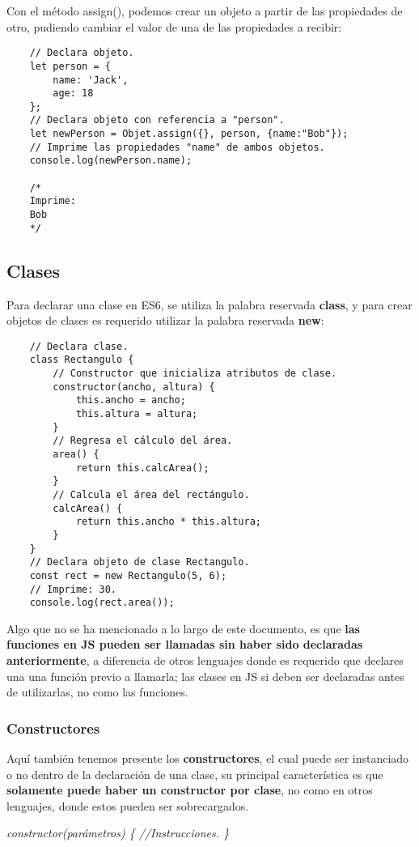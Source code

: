 Con el método assign(), podemos crear un objeto a partir de las propiedades de otro, pudiendo cambiar el valor de una de las propiedades a recibir:
\begin{lstlisting}
    // Declara objeto.
    let person = {
        name: 'Jack',
        age: 18
    };
    // Declara objeto con referencia a "person".
    let newPerson = Objet.assign({}, person, {name:"Bob"});
    // Imprime las propiedades "name" de ambos objetos.
    console.log(newPerson.name);

    /*
    Imprime:
    Bob
    */
\end{lstlisting}


\subsection{Clases}
\hspace{0.55cm}Para declarar una clase en ES6, se utiliza la palabra reservada \textbf{class}, y para crear objetos de clases es requerido utilizar la palabra reservada \textbf{new}:
\begin{lstlisting}
    // Declara clase.
    class Rectangulo {
        // Constructor que inicializa atributos de clase.
        constructor(ancho, altura) {
            this.ancho = ancho;
            this.altura = altura;
        }
        // Regresa el cálculo del área.
        area() {
            return this.calcArea();
        }
        // Calcula el área del rectángulo.
        calcArea() {
            return this.ancho * this.altura;
        }
    }
    // Declara objeto de clase Rectangulo.
    const rect = new Rectangulo(5, 6);
    // Imprime: 30.
    console.log(rect.area());
\end{lstlisting}

Algo que no se ha mencionado a lo largo de este documento, es que \textbf{las funciones en JS pueden ser llamadas sin haber sido declaradas anteriormente}, a diferencia de otros lenguajes donde es requerido que declares una una función previo a llamarla; las clases en JS si deben ser declaradas antes de utilizarlas, no como las funciones.


\subsubsection{Constructores}
\hspace{0.55cm}Aquí también tenemos presente los \textbf{constructores}, el cual puede ser instanciado o no dentro de la declaración de una clase, su principal característica es que \textbf{solamente puede haber un constructor por clase}, no como en otros lenguajes, donde estos pueden ser sobrecargados.
\begin{center}
    \textit{constructor(parámetros) \{ //Instrucciones. \}}
\end{center}


